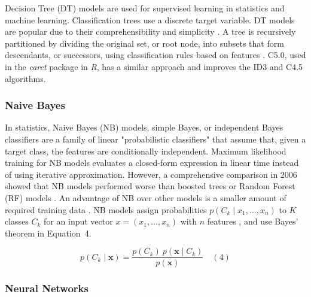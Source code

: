 \let\LaTeXcline\cline\documentclass[sn-mathphys-num]{sn-jnl}\let\cline\LaTeXcline
\begin{document}
Decision Tree (DT) models are used for supervised learning in statistics and machine learning. Classification trees use a discrete target variable. DT models are popular due to their comprehensibility and simplicity \cite{Wu2008}. A tree is recursively partitioned by dividing the original set, or root node, into subsets that form descendants, or successors, using classification rules based on features \cite{ShalevShwartz2014}. C5.0, used in the \textit{caret} package in \textit{R}, has a similar approach and improves the ID3 and C4.5 algorithms.

\subsubsection{Naive Bayes}

In statistics, Naive Bayes (NB) models, simple Bayes, or independent Bayes \cite{Hand2001} classifiers are a family of linear "probabilistic classifiers" that assume that, given a target class, the features are conditionally independent. Maximum likelihood training for NB models evaluates a closed-form expression \cite{Russell1999} in linear time instead of using iterative approximation. However, a comprehensive comparison in 2006 showed that NB models performed worse than boosted trees or Random Forest (RF) models \cite{Caruana2006}. An advantage of NB over other models is a smaller amount of required training data \cite{John2013}. NB models assign probabilities $p(C_{k}\mid x_{1},\ldots, x_{n})$ to $K$ classes $C_{k}$ for an input vector $x = (x_{1},\ldots, x_{n})$ with $n$ features \cite{Murty2011}, and use Bayes' theorem in Equation~4.

\begin{equation}
	p(C_{k}\mid \mathbf{x})={\frac{p(C_{k})\ p(\mathbf{x} \mid C_{k})}{p(\mathbf{x})}}
	\quad\left(4\right)
\end{equation}

\subsubsection{Neural Networks}
\end{document}

